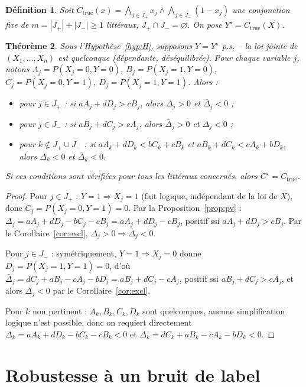 \documentclass[12pt,a4paper]{article}
\newtheorem{theorem}{Théorème}
\newtheorem{definition}[theorem]{Définition}
\theoremstyle{remark}
\begin{document}
\begin{definition}\label{def:ctrue}
Soit $C_{\mathrm{true}}(x)=\bigwedge_{j\in J_+}x_j\wedge\bigwedge_{j\in J_-}(1-x_j)$
une conjonction fixe de $m=|J_+|+|J_-|\ge1$ littéraux, $J_+\cap J_-=\varnothing$.
On pose $Y^\star=C_{\mathrm{true}}(X)$.
\end{definition}

\begin{theorem}\label{thm:identif}
Sous l'Hypothèse~\ref{hyp:H}, supposons $Y=Y^\star$ p.s. -- la loi jointe de
$(X_1,\ldots,X_n)$ est quelconque (dépendante, déséquilibrée). Pour chaque
variable $j$, notons $A_j=P(X_j{=}0,Y{=}0)$, $B_j=P(X_j{=}1,Y{=}0)$,
$C_j=P(X_j{=}0,Y{=}1)$, $D_j=P(X_j{=}1,Y{=}1)$. Alors :
\begin{itemize}
  \item pour $j\in J_+$ : si $aA_j+dD_j>cB_j$, alors $\Delta_j>0$ et $\bar\Delta_j<0$ ;
  \item pour $j\in J_-$ : si $aB_j+dC_j>cA_j$, alors $\bar\Delta_j>0$ et $\Delta_j<0$ ;
  \item pour $k\notin J_+\cup J_-$ : si $aA_k+dD_k<bC_k+cB_k$ \emph{et}
  $aB_k+dC_k<cA_k+bD_k$, alors $\Delta_k<0$ et $\bar\Delta_k<0$.
\end{itemize}
Si ces conditions sont vérifiées pour tous les littéraux concernés, alors
$C^\star=C_{\mathrm{true}}$.
\end{theorem}

\begin{proof}
Pour $j\in J_+$ : $Y{=}1\Rightarrow X_j{=}1$ (fait logique, indépendant de la
loi de $X$), donc $C_j=P(X_j{=}0,Y{=}1)=0$. Par la Proposition~\ref{prop:pv} :
$\Delta_j=aA_j+dD_j-bC_j-cB_j=aA_j+dD_j-cB_j$, positif ssi $aA_j+dD_j>cB_j$.
Par le Corollaire~\ref{cor:excl}, $\Delta_j>0\Rightarrow\bar\Delta_j<0$.

Pour $j\in J_-$ : symétriquement, $Y{=}1\Rightarrow X_j{=}0$ donne
$D_j=P(X_j{=}1,Y{=}1)=0$, d'où $\bar\Delta_j=dC_j+aB_j-cA_j-bD_j=aB_j+dC_j-cA_j$,
positif ssi $aB_j+dC_j>cA_j$, et alors $\Delta_j<0$ par le Corollaire~\ref{cor:excl}.

Pour $k$ non pertinent : $A_k,B_k,C_k,D_k$ sont quelconques, aucune
simplification logique n'est possible, donc on requiert directement
$\Delta_k=aA_k+dD_k-bC_k-cB_k<0$ et $\bar\Delta_k=dC_k+aB_k-cA_k-bD_k<0$.
\end{proof}

\section{Robustesse à un bruit de label}
\end{document}
